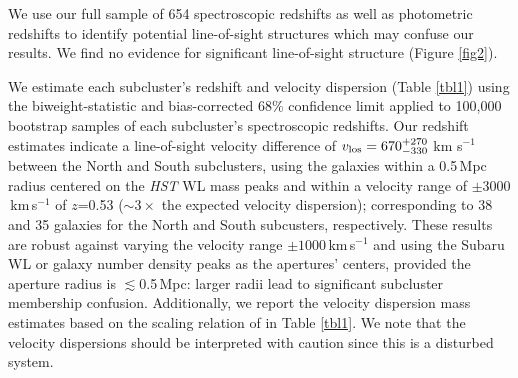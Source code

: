 We use our full sample of 654 spectroscopic redshifts as well as photometric redshifts to identify potential line-of-sight structures which may confuse our results.
We find no evidence for significant line-of-sight structure (Figure \ref{fig2}).

We estimate each subcluster's redshift and velocity dispersion (Table \ref{tbl1}) using the biweight-statistic and bias-corrected 68\% confidence limit \citep{beer90} applied to 100,000 bootstrap samples of each subcluster's spectroscopic redshifts.
Our redshift estimates indicate a line-of-sight velocity difference of $v_{\rm los}=670^{+270}_{-330}$ km s$^{-1}$ between the North and South subclusters, using the galaxies within a 0.5\,Mpc radius centered on the {\it HST} WL mass peaks and within a velocity range of $\pm 3000$\,km\,s$^{-1}$ of $z$=0.53 ($\sim3\times$ the expected velocity dispersion); corresponding to 38 and 35 galaxies for the North and South subcusters, respectively.
These results are robust against varying the velocity range $\pm1000$\,km\,s$^{-1}$ and using the Subaru WL or galaxy number density peaks as the apertures' centers, provided the aperture radius is $\lesssim$0.5\,Mpc: larger radii lead to significant subcluster membership confusion.
Additionally, we report the velocity dispersion mass estimates based on the scaling relation of \citet{evra08} in Table \ref{tbl1}.
We note that the velocity dispersions should be interpreted with caution since this is a disturbed system.

